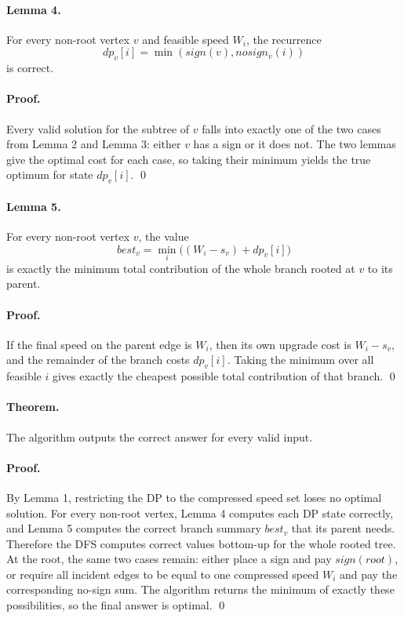 \documentclass[11pt]{article}
\begin{document}
\paragraph{Lemma 4.}
For every non-root vertex $v$ and feasible speed $W_i$, the recurrence
\[
    dp_v[i] = \min(sign(v), nosign_v(i))
\]
is correct.

\paragraph{Proof.}
Every valid solution for the subtree of $v$ falls into exactly one of the two cases from Lemma 2 and Lemma 3:
either $v$ has a sign or it does not.
The two lemmas give the optimal cost for each case, so taking their minimum yields the true optimum for state
$dp_v[i]$. \qed

\paragraph{Lemma 5.}
For every non-root vertex $v$, the value
\[
    best_v = \min_i \bigl((W_i - s_v) + dp_v[i]\bigr)
\]
is exactly the minimum total contribution of the whole branch rooted at $v$ to its parent.

\paragraph{Proof.}
If the final speed on the parent edge is $W_i$, then its own upgrade cost is $W_i - s_v$, and the remainder of the
branch costs $dp_v[i]$.
Taking the minimum over all feasible $i$ gives exactly the cheapest possible total contribution of that branch. \qed

\paragraph{Theorem.}
The algorithm outputs the correct answer for every valid input.

\paragraph{Proof.}
By Lemma 1, restricting the DP to the compressed speed set loses no optimal solution.
For every non-root vertex, Lemma 4 computes each DP state correctly, and Lemma 5 computes the correct branch summary
$best_v$ that its parent needs.
Therefore the DFS computes correct values bottom-up for the whole rooted tree.
At the root, the same two cases remain: either place a sign and pay $sign(root)$, or require all incident edges to be
equal to one compressed speed $W_i$ and pay the corresponding no-sign sum.
The algorithm returns the minimum of exactly these possibilities, so the final answer is optimal. \qed
\end{document}
